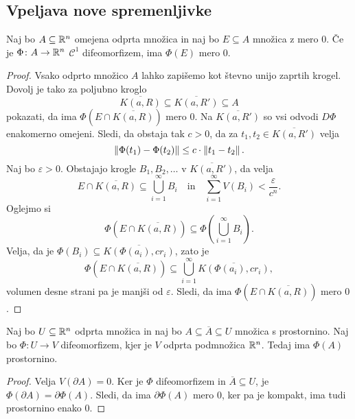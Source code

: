 \subsection{Vpeljava nove spremenljivke}

\begin{lema}
Naj bo $A \subseteq \mathbb{R}^n$ omejena odprta množica in naj bo
$E \subseteq A$ množica z mero $0$. Če je $\Phi \colon A \to \mathbb{R}^n$
$\mathcal{C}^1$ difeomorfizem, ima $\Phi(E)$ mero $0$.
\end{lema}

\begin{proof}
Vsako odprto množico $A$ lahko zapišemo kot števno unijo zaprtih
krogel. Dovolj je tako za poljubno kroglo
\[
\overline{K(a,R)} \subseteq \overline{K(a,R')} \subseteq A
\]
pokazati, da ima $\Phi\left(E \cap \overline{K(a,R)}\right)$ mero
$0$. Na $\overline{K(a,R')}$ so vsi odvodi $D\Phi$ enakomerno
omejeni. Sledi, da obstaja tak $c > 0$, da za
$t_1,t_2 \in \overline{K(a,R')}$ velja
\[
\left\lVert \Phi(t_1) - \Phi(t_2)\right\rVert \leq c \cdot \left\lVert t_1 - t_2\right\rVert.
\]
Naj bo $\varepsilon > 0$. Obstajajo krogle $B_1,B_2,\dots$ v
$\overline{K(a,R')}$, da velja
\[
E \cap \overline{K(a,R)} \subseteq \bigcup_{i=1}^\infty B_i
\quad \text{in} \quad
\sum_{i=1}^\infty V(B_i) < \frac{\varepsilon}{c^n}.
\]
Oglejmo si
\[
\Phi\left(E \cap \overline{K(a,R)}\right) \subseteq
\Phi\left(\bigcup_{i=1}^\infty B_i\right).
\]
Velja, da je $\Phi(B_i) \subseteq \overline{K(\Phi(a_i), cr_i)}$,
zato je
\[
\Phi\left(E \cap \overline{K(a,R)}\right) \subseteq
\bigcup_{i=1}^\infty \overline{K(\Phi(a_i), cr_i)},
\]
volumen desne strani pa je manjši od $\varepsilon$. Sledi, da ima
$\Phi(E \cap \overline{K(a,R)})$ mero $0$.
\end{proof}

\begin{posledica}
Naj bo $U \subseteq \mathbb{R}^n$ odprta množica in naj bo
$A \subseteq \overline{A} \subseteq U$ množica s prostornino. Naj
bo $\Phi \colon U \to V$ difeomorfizem, kjer je $V$ odprta
podmnožica $\mathbb{R}^n$. Tedaj ima $\Phi(A)$ prostornino.
\end{posledica}

\begin{proof}
Velja $V(\partial A) = 0$. Ker je $\Phi$ difeomorfizem in
$\overline{A} \subseteq U$, je
$\Phi(\partial A) = \partial \Phi(A)$. Sledi, da ima
$\partial \Phi(A)$ mero $0$, ker pa je kompakt, ima tudi
prostornino enako $0$.
\end{proof}


